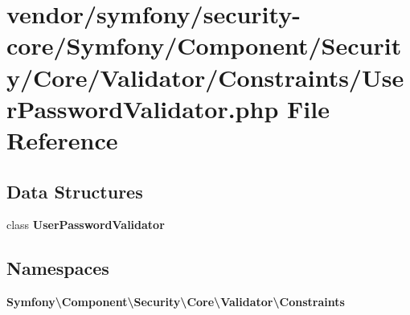 \section{vendor/symfony/security-\/core/\+Symfony/\+Component/\+Security/\+Core/\+Validator/\+Constraints/\+User\+Password\+Validator.php File Reference}
\label{_user_password_validator_8php}
\subsection*{Data Structures}
\begin{DoxyCompactItemize}
\item 
class {\bf User\+Password\+Validator}
\end{DoxyCompactItemize}
\subsection*{Namespaces}
\begin{DoxyCompactItemize}
\item 
 {\bf Symfony\textbackslash{}\+Component\textbackslash{}\+Security\textbackslash{}\+Core\textbackslash{}\+Validator\textbackslash{}\+Constraints}
\end{DoxyCompactItemize}
